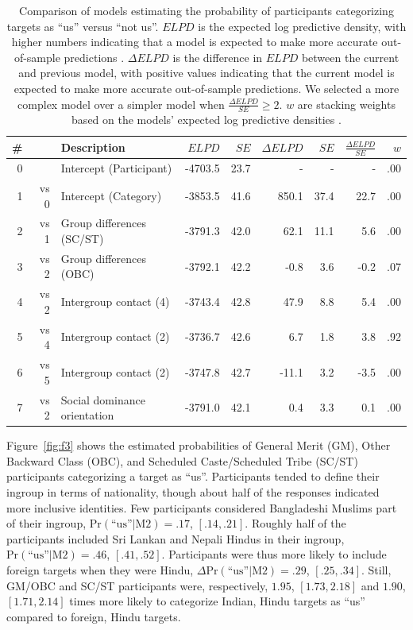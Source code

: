 \documentclass[12pt, a4paper]{article}
\newcommand{\pest}[4]{$ \text{Pr} (\text{``us''} | \text{#1}) = #2$, $[#3, #4]$}
\newcommand{\pdif}[4]{$ \Delta\text{Pr} (\text{``us''} | \text{#1}) = #2$, $[#3, #4]$}
\begin{document}
\begin{table}
\caption{
Comparison of models estimating the probability of participants categorizing targets as ``us'' versus ``not us''. $\textit{ELPD}$ is the expected log predictive density, with higher numbers indicating that a model is expected to make more accurate out-of-sample predictions \protect{}. $\Delta\textit{ELPD}$ is the difference in $\textit{ELPD}$ between the current and previous model, with positive values indicating that the current model is expected to make more accurate out-of-sample predictions. We selected a more complex model over a simpler model when $\frac{\Delta\textit{ELPD}}{\textit{SE}} \geq 2$. $w$ are stacking weights based on the models' expected log predictive densities \protect\cite{yao_using_2018}.
}
\centering
{}
\small
\begin{tabularx}{\linewidth}{r@{~}rXrrrrrr} \toprule
\# &  & Description & $\textit{ELPD}$ & $\textit{SE}$ & $\Delta\textit{ELPD}$ & $\textit{SE}$ & $\frac{\Delta\textit{ELPD}}{\textit{SE}}$ & $w$ \\ \midrule 
0 &      & Intercept (Participant) & -4703.5 & 23.7 &     - &    - &    - & .00 \\ 
1 & vs 0 & Intercept (Category)    & -3853.5 & 41.6 & 850.1 & 37.4 & 22.7 & .00 \\
2 & vs 1 & Group differences (SC/ST)       & -3791.3 & 42.0 &  62.1 & 11.1 &  5.6 & .00 \\
3 & vs 2 & Group differences (OBC)         & -3792.1 & 42.2 &  -0.8 &  3.6 & -0.2 & .07 \\ \midrule
4 & vs 2 & Intergroup contact (4) & -3743.4 & 42.8 &  47.9 &  8.8 &  5.4 & .00 \\
5 & vs 4 & Intergroup contact (2) & -3736.7 & 42.6 &   6.7 &  1.8 &  3.8 & .92 \\
6 & vs 5 & Intergroup contact (2) & -3747.8 & 42.7 & -11.1 &  3.2 & -3.5 & .00 \\
7 & vs 2 & Social dominance orientation & -3791.0 & 42.1 &   0.4 &  3.3 &  0.1 & .00 \\
\bottomrule
\end{tabularx}
\label{tab:t2}
\end{table}

Figure~\ref{fig:f3} shows the estimated probabilities of General Merit (GM), Other Backward Class (OBC), and Scheduled Caste/Scheduled Tribe (SC/ST) participants categorizing a target as ``us''. Participants tended to define their ingroup in terms of nationality, though about half of the responses indicated more inclusive identities. Few participants considered Bangladeshi Muslims part of their ingroup, \pest{M2}{.17}{.14}{.21}. Roughly half of the participants included Sri Lankan and Nepali Hindus in their ingroup, \pest{M2}{.46}{.41}{.52}. Participants were thus more likely to include foreign targets when they were Hindu, \pdif{M2}{.29}{.25}{.34}. Still, GM/OBC and SC/ST participants were, respectively, $1.95$, $[1.73, 2.18]$ and $1.90$, $[1.71, 2.14]$ times more likely to categorize Indian, Hindu targets as ``us'' compared to foreign, Hindu targets.
\end{document}
